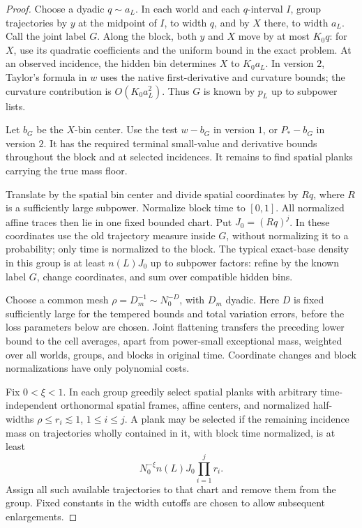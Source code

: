 \begin{proof}
Choose a dyadic \(q\sim a_L\).
In each world and each \(q\)-interval \(I\), group
trajectories by \(y\) at the midpoint of \(I\), to width
\(q\), and by \(X\) there, to width \(a_L\).
Call the joint label \(G\).
Along the block, both \(y\) and \(X\) move by at most
\(K_0q\): for \(X\), use its quadratic coefficients and
the uniform bound in the exact problem.
At an observed incidence, the hidden bin determines \(X\)
to \(K_0a_L\).  In version \(2\), Taylor's formula in \(w\)
uses the native first-derivative and curvature bounds;
the curvature contribution is \(O(K_0a_L^2)\).
Thus \(G\) is known by \(p_L\) up to subpower lists.

Let \(b_G\) be the \(X\)-bin center.
Use the test \(w-b_G\) in version \(1\), or \(P_*-b_G\)
in version \(2\).
It has the required terminal small-value and derivative
bounds throughout the block and at selected incidences.
It remains to find spatial planks carrying the true mass
floor.

Translate by the spatial bin center and divide spatial
coordinates by \(Rq\), where \(R\) is a sufficiently
large subpower.  Normalize block time to \([0,1]\).
All normalized affine traces then lie in one fixed
bounded chart.  Put \(J_0=(Rq)^j\).
In these coordinates use the old trajectory measure
inside \(G\), without normalizing it to a probability;
only time is normalized to the block.
The typical exact-base density in this group is at least
\(n(L)J_0\) up to subpower factors: refine by the known
label \(G\), change coordinates, and sum over compatible
hidden bins.

Choose a common mesh \(\rho=D_m^{-1}\sim N_0^{-D}\),
with \(D_m\) dyadic.  Here \(D\) is fixed sufficiently
large for the tempered bounds and total variation
errors, before the loss parameters below are chosen.
Joint flattening transfers the preceding lower bound
to the cell averages, apart from power-small exceptional
mass, weighted over all worlds, groups, and blocks in
original time.  Coordinate changes and block
normalizations have only polynomial costs.

Fix \(0<\xi<1\).
In each group greedily select spatial planks with
arbitrary time-independent orthonormal spatial frames, affine centers, and
normalized half-widths
\(\rho\le r_i\lesssim1\), \(1\le i\le j\).
A plank may be selected if the remaining incidence mass
on trajectories wholly contained in it, with block time
normalized, is at least
\begin{equation}
 N_0^{-\xi}n(L)J_0\prod_{i=1}^j r_i.
 \label{a01:greedy-threshold}
\end{equation}
Assign all such available trajectories to that chart and
remove them from the group.  Fixed constants in the
width cutoffs are chosen to allow subsequent
enlargements.


\end{proof}
